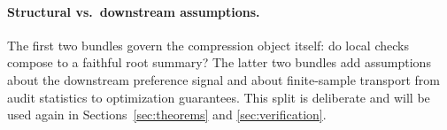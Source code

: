 \paragraph{Structural vs.\ downstream assumptions.}
The first two bundles govern the compression object itself: do local checks compose to a faithful root summary? The latter two bundles add assumptions about the downstream preference signal and about finite-sample transport from audit statistics to optimization guarantees. This split is deliberate and will be used again in Sections~\ref{sec:theorems} and \ref{sec:verification}.

